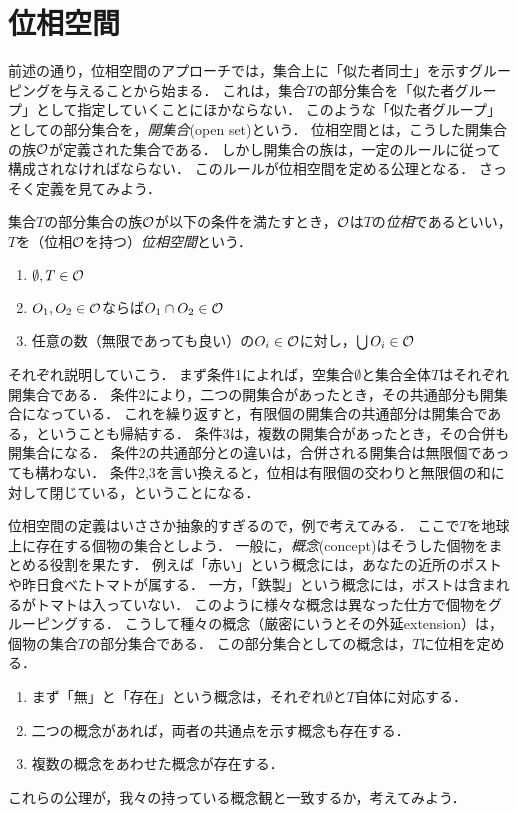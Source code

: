 \documentclass[11pt,a4paper]{jsarticle}
\begin{document}
\section{位相空間}

前述の通り，位相空間のアプローチでは，集合上に「似た者同士」を示すグルーピングを与えることから始まる．
これは，集合$T$の部分集合を「似た者グループ」として指定していくことにほかならない．
このような「似た者グループ」としての部分集合を，\emph{開集合}(open set)という．
位相空間とは，こうした開集合の族$\mathcal{O}$が定義された集合である．
しかし開集合の族は，一定のルールに従って構成されなければならない．
このルールが位相空間を定める公理となる．
さっそく定義を見てみよう．

\begin{dfn}[位相空間]
集合$T$の部分集合の族$\mathcal{O}$が以下の条件を満たすとき，$\mathcal{O}$は$T$の\emph{位相}であるといい，$T$を（位相$\mathcal{O}$を持つ）\emph{位相空間}という．
\begin{enumerate}
 \item $\emptyset, T \in \mathcal{O}$
 \item $O_1, O_2 \in \mathcal{O}$ならば$O_1 \cap O_2 \in \mathcal{O}$
 \item 任意の数（無限であっても良い）の$O_i \in \mathcal{O}$に対し，$\bigcup O_i \in \mathcal{O}$
\end{enumerate}
\end{dfn}

それぞれ説明していこう．
まず条件1によれば，空集合$\emptyset$と集合全体$T$はそれぞれ開集合である．
条件2により，二つの開集合があったとき，その共通部分も開集合になっている．
これを繰り返すと，有限個の開集合の共通部分は開集合である，ということも帰結する．
条件3は，複数の開集合があったとき，その合併も開集合になる．
条件2の共通部分との違いは，合併される開集合は無限個であっても構わない．
条件2,3を言い換えると，位相は有限個の交わりと無限個の和に対して閉じている，ということになる．

\begin{example}
位相空間の定義はいささか抽象的すぎるので，例で考えてみる．
ここで$T$を地球上に存在する個物の集合としよう．
一般に，\emph{概念}(concept)はそうした個物をまとめる役割を果たす．
例えば「赤い」という概念には，あなたの近所のポストや昨日食べたトマトが属する．
一方，「鉄製」という概念には，ポストは含まれるがトマトは入っていない．
このように様々な概念は異なった仕方で個物をグルーピングする．
こうして種々の概念（厳密にいうとその外延extension）は，個物の集合$T$の部分集合である．
この部分集合としての概念は，$T$に位相を定める．
\begin{enumerate}
 \item まず「無」と「存在」という概念は，それぞれ$\emptyset$と$T$自体に対応する．
 \item 二つの概念があれば，両者の共通点を示す概念も存在する．
 \item 複数の概念をあわせた概念が存在する．
\end{enumerate}
これらの公理が，我々の持っている概念観と一致するか，考えてみよう．
\end{example}
\end{document}
